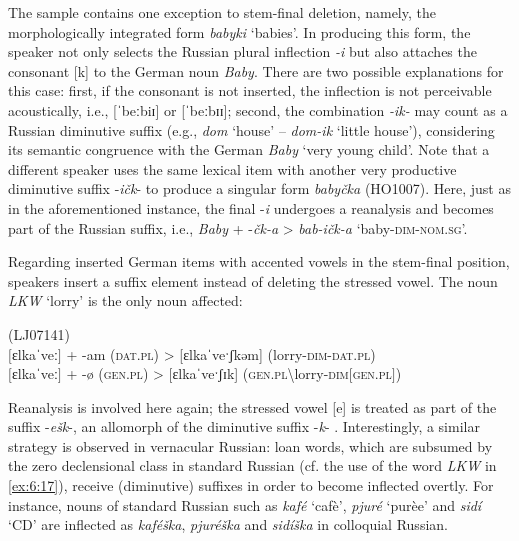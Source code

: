 The sample contains one exception to stem-final deletion, namely, the morphologically integrated form \textit{babyki} ‘babies’. In producing this form, the speaker not only selects the Russian plural inflection \textit{-i} but also attaches the consonant [k] to the German noun \textit{Baby}. There are two possible explanations for this case: first, if the consonant is not inserted, the inflection is not perceivable acoustically, i.e., [ˈbeːbiɪ] or  [ˈbeːbɪɪ]; second, the combination \textit{-ik-} may count as a Russian diminutive suffix (e.g., \textit{dom} `house' -- \textit{dom-ik} `little house'), considering its semantic congruence with  the German \textit{Baby} ‘very young child’. Note that a different speaker uses the same lexical item with another very productive diminutive suffix -\textit{ičk}- \citep[cf.][209--210]{rusgramm-tom1} to produce a singular form \textit{babyčka} (HO1007). Here, just as in the aforementioned instance, the final -\textit{i} undergoes a reanalysis and becomes part of the Russian suffix, i.e., \textit{Baby} + -\textit{čk-a} > \textit{bab-ičk-a} `baby-\textsc{dim-nom.sg}'.

Regarding inserted German items with accented vowels in the stem-final position, speakers insert a suffix element instead of deleting the stressed vowel. The noun \textit{LKW} `lorry' is the only noun affected:

\ea
\label{ex:6:19}
(LJ07141)\\
\([\)ɛlkaˈveː\(]\) + -am (\textsc{dat.pl}) > [ɛlkaˈveˑʃkəm] (lorry-\textsc{dim-dat.pl})\\
\([\)ɛlkaˈveː\(]\) + -\o{} (\textsc{gen.pl}) > [ɛlkaˈveˑʃɪk] (\textsc{gen.pl}\textbackslash lorry-\textsc{dim}\([\)\textsc{gen.pl}\(]\))
\z

\noindent Reanalysis is involved here again; the stressed vowel [e] is treated as part of the suffix -\textit{ešk}-, an allomorph of the diminutive suffix -\textit{k}- \citep[2010]{rusgramm-tom1}. Interestingly, a similar strategy is observed in vernacular Russian: loan words, which are subsumed by  the zero declensional class in standard Russian (cf. the use of the word \textit{LKW} in \ref{ex:6:17}), receive (diminutive) suffixes in order to become inflected overtly. For instance, nouns of standard Russian such as \textit{kafé} `cafè', \textit{pjuré} `purèe' and \textit{sidí} ‘CD’ are inflected as \textit{kaféška}, \textit{pjuréška} and \textit{sidíška} in colloquial Russian. 


